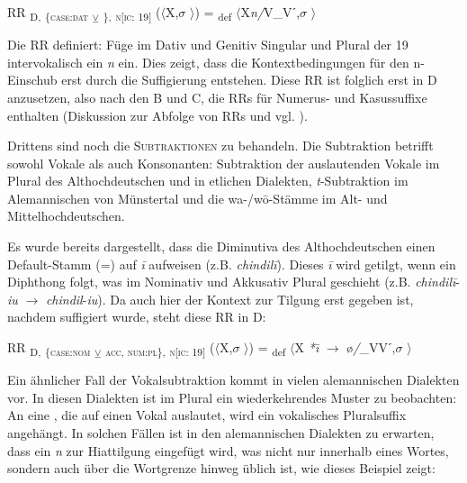 \ea%
\label{ex:key:56}
 RR \textsubscript{D,} \textsubscript{\{\textsc{case:dat}} \textsubscript{\tiny $\veebar$}\textsubscript{ \GEN\},} \textsubscript{\textsc{n[}\textsc{ic:} 19]} ($\langle$X,$\sigma$ $\rangle$) = \textsubscript{def} $\langle$X\textit{n/}V\_Vˊ,$\sigma$ $\rangle$\\
\z

Die RR  definiert: Füge im Dativ und Genitiv Singular und Plural der  19 intervokalisch ein \textit{n} ein. Dies zeigt, dass die Kontextbedingungen für den n-Einschub erst durch die Suffigierung entstehen. Diese RR ist folglich erst in  D anzusetzen, also nach den  B und C, die RRs für Numerus- und Kasussuffixe enthalten (Diskussion zur Abfolge von RRs und  vgl. ).

Drittens sind noch die \textsc{Subtraktionen} zu behandeln. Die Subtraktion betrifft sowohl Vokale als auch Konsonanten: Subtraktion der auslautenden Vokale im Plural des Althochdeutschen und in etlichen Dialekten, \textit{t}{}-Subtraktion im Alemannischen von Münstertal und die wa-/w\=o-Stäm\-me im Alt- und Mittelhochdeutschen.

Es wurde bereits dargestellt, dass die Diminutiva des Althochdeutschen einen Default-Stamm (=) auf \textit{\=i} aufweisen (z.B. \textit{chindil\=i}). Dieses \textit{\=i} wird getilgt, wenn ein Diphthong folgt, was im Nominativ und Akkusativ Plural geschieht (z.B. \textit{chindil\=i}-\textit{iu} $\rightarrow$ \textit{chindil}-\textit{iu}). Da auch hier der Kontext zur Tilgung erst gegeben ist, nachdem suffigiert wurde, steht diese RR in  D:

\ea%
\label{ex:key:57}
 RR \textsubscript{D,} \textsubscript{\{\textsc{case:nom}} \textsubscript{\tiny $\veebar$}\textsubscript{ \textsc{acc}, \textsc{num:pl}\},} \textsubscript{\textsc{n[}\textsc{ic:} 19]} ($\langle$X,$\sigma$ $\rangle$) = \textsubscript{def} $\langle$X \textit{*\=\i} $\rightarrow$ ø\textit{/}\_VVˊ,$\sigma$ $\rangle$\\
\z

Ein ähnlicher Fall der Vokalsubtraktion kommt in vielen alemannischen Dialekten vor. In diesen Dialekten ist im Plural ein wiederkehrendes Muster zu beobachten: An eine , die auf einen Vokal auslautet, wird ein vokalisches Pluralsuffix angehängt. In solchen Fällen ist in den alemannischen Dialekten zu erwarten, dass ein \textit{n} zur Hiattilgung eingefügt wird, was nicht nur innerhalb eines Wortes, sondern auch über die Wortgrenze hinweg üblich ist, wie dieses Beispiel zeigt:

